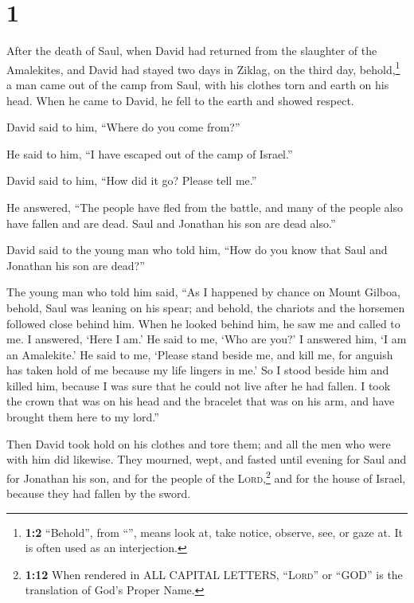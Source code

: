 \hypertarget{section}{%
\section{1}\label{section}}

 After the death of Saul, when David had returned from the
slaughter of the Amalekites, and David had stayed two days in Ziklag,
 on the third day, behold,\footnote{\textbf{1:2}
  ``Behold'', from ``'', means look at, take notice,
  observe, see, or gaze at. It is often used as an interjection.} a man
came out of the camp from Saul, with his clothes torn and earth on his
head. When he came to David, he fell to the earth and showed respect.

 David said to him, ``Where do you come from?''

He said to him, ``I have escaped out of the camp of Israel.''

 David said to him, ``How did it go? Please tell me.''

He answered, ``The people have fled from the battle, and many of the
people also have fallen and are dead. Saul and Jonathan his son are dead
also.''

 David said to the young man who told him, ``How do you
know that Saul and Jonathan his son are dead?''

 The young man who told him said, ``As I happened by
chance on Mount Gilboa, behold, Saul was leaning on his spear; and
behold, the chariots and the horsemen followed close behind him.
 When he looked behind him, he saw me and called to me. I
answered, `Here I am.'  He said to me, `Who are you?' I
answered him, `I am an Amalekite.'  He said to me, `Please
stand beside me, and kill me, for anguish has taken hold of me because
my life lingers in me.'  So I stood beside him and killed
him, because I was sure that he could not live after he had fallen. I
took the crown that was on his head and the bracelet that was on his
arm, and have brought them here to my lord.''

 Then David took hold on his clothes and tore them; and
all the men who were with him did likewise.  They
mourned, wept, and fasted until evening for Saul and for Jonathan his
son, and for the people of the \textsc{Lord},\footnote{\textbf{1:12}
  When rendered in ALL CAPITAL LETTERS, ``\textsc{Lord}'' or ``GOD'' is
  the translation of God's Proper Name.} and for the house of Israel,
because they had fallen by the sword.

